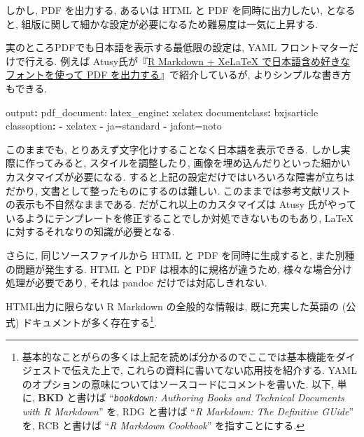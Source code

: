 \documentclass[
]{bxjsbook}
\newenvironment{Shaded}{\begin{snugshade}}{\end{snugshade}}
\newcommand{\AttributeTok}[1]{\textcolor[rgb]{0.77,0.63,0.00}{#1}}
\newcommand{\FunctionTok}[1]{\textcolor[rgb]{0.00,0.00,0.00}{#1}}
\newcommand{\KeywordTok}[1]{\textcolor[rgb]{0.13,0.29,0.53}{\textbf{#1}}}
\theoremstyle{definition}
\theoremstyle{definition}
\theoremstyle{definition}
\theoremstyle{remark}
\begin{document}
しかし, PDF を出力する, あるいは HTML と PDF を同時に出力したい,
となると, 組版に関して細かな設定が必要になるため難易度は一気に上昇する.

実のところPDFでも日本語を表示する最低限の設定は, YAML
フロントマターだけで行える. 例えば
Atusy氏が『\href{https://blog.atusy.net/2019/05/14/rmd2pdf-any-font/}{R
Markdown + XeLaTeX で日本語含め好きなフォントを使って PDF
を出力する}』で紹介しているが, よりシンプルな書き方もできる.

\begin{Shaded}
\begin{Highlighting}[]
\FunctionTok{output}\KeywordTok{:}\AttributeTok{ pdf\_document:}
\AttributeTok{    }\FunctionTok{latex\_engine}\KeywordTok{:}\AttributeTok{ xelatex}
\FunctionTok{documentclass}\KeywordTok{:}\AttributeTok{ bxjsarticle}
\FunctionTok{classoption}\KeywordTok{:}
\AttributeTok{  }\KeywordTok{{-}}\AttributeTok{ xelatex}
\AttributeTok{  }\KeywordTok{{-}}\AttributeTok{ ja=standard}
\AttributeTok{  }\KeywordTok{{-}}\AttributeTok{ jafont=noto}
\end{Highlighting}
\end{Shaded}

このままでも, とりあえず文字化けすることなく日本語を表示できる.
しかし実際に作ってみると, スタイルを調整したり,
画像を埋め込んだりといった細かいカスタマイズが必要になる.
すると上記の設定だけではいろいろな障害が立ちはだかり,
文書として整ったものにするのは難しい.
このままでは参考文献リストの表示も不自然なままである.
だがこれ以上のカスタマイズは Atusy
氏がやっているようにテンプレートを修正することでしか対処できないものもあり,
\LaTeX に対するそれなりの知識が必要となる.

さらに, 同じソースファイルから HTML と PDF を同時に生成すると,
また別種の問題が発生する. HTML と PDF は根本的に規格が違うため,
様々な場合分け処理が必要であり, それは pandoc だけでは対応しきれない.

HTML出力に限らない R Markdown の全般的な情報は, 既に充実した英語の
(公式) ドキュメントが多く存在する\footnote{基本的なことがらの多くは上記を読めば分かるのでここでは基本機能をダイジェストで伝えた上で,
  これらの資料に書いてない応用技を紹介する. YAML
  のオプションの意味についてはソースコードにコメントを書いた. 以下,
  単に, \textbf{BKD} と書けば ``\emph{\texttt{bookdown}: Authoring Books
  and Technical Documents with R Markdown}'' \autocite{R-bookdown} を,
  RDG と書けば ``\emph{R Markdown: The Definitive GUide}''
  \autocite{rmarkdown2018} を, RCB と書けば ``\emph{R Markdown
  Cookbook}'' \autocite{xie2020Markdown} を指すことにする.}.
\end{document}
